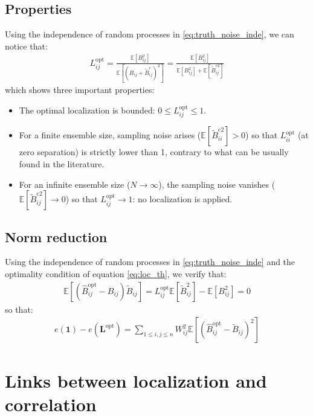 \documentclass[12pt]{scrartcl}
\begin{document}
\subsection{Properties}
Using the independence of random processes in \eqref{eq:truth_noise_inde}, we can notice that:
\begin{align}
L^\mathrm{opt}_{ij} = \frac{\mathbb{E}\left[ B^2_{ij} \right]}{\mathbb{E}\left[ \left(B_{ij} + \widetilde{B}^e_{ij}\right)^2 \right]} = \frac{\mathbb{E}\left[ B^2_{ij} \right]}{\mathbb{E}\left[ B^2_{ij} \right] + \mathbb{E}\left[ \widetilde{B}_{ij}^{e2} \right]}
\end{align}
which shows three important properties:
\begin{itemize}
\item The optimal localization is bounded: $0 \le L^\mathrm{opt}_{ij} \le 1$.
\item For a finite ensemble size, sampling noise arises ($\mathbb{E}\left[ \widetilde{B}_{ii}^{e2} \right] > 0$) so that $L^\mathrm{opt}_{ii}$ (at zero separation) is strictly lower than 1, contrary to what can be usually found in the literature.
\item For an infinite ensemble size ($N \rightarrow \infty$), the sampling noise vanishes ($\mathbb{E}\left[ \widetilde{B}_{ij}^{e2} \right] \rightarrow 0$) so that $L^\mathrm{opt}_{ij} \rightarrow 1$: no localization is applied.
\end{itemize}

\subsection{Norm reduction}
Using the independence of random processes in \eqref{eq:truth_noise_inde} and the optimality condition of equation \eqref{eq:loc_th}, we verify that:
\begin{align}
\mathbb{E}\left[\left(\widehat{B}_{ij}^\mathrm{opt} - B_{ij}\right) \widetilde{B}_{ij} \right] = L_{ij}^\mathrm{opt} \mathbb{E}\left[\widetilde{B}_{ij}^2\right] - \mathbb{E}\left[B^2_{ij} \right] = 0 
\end{align}
so that:
\begin{align}
e\left(\boldsymbol{1}\right) - e\left(\mathbf{L}^\mathrm{opt}\right) = \sum_{1 \le i,j \le n} W_{ij}^2 \mathbb{E}\left[ \left(\widehat{B}_{ij}^\mathrm{opt} - \widetilde{B}_{ij}\right)^2\right]
\end{align}

\clearpage

\section{Links between localization and correlation}
\end{document}
